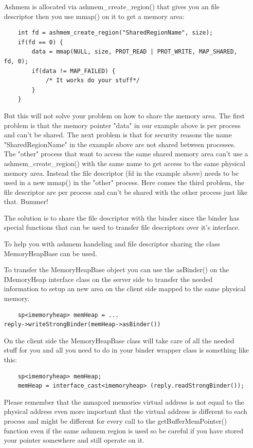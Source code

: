 \documentclass[a4paper,11pt]{article}
\begin{document}
Ashmem is allocated via ashmem_create_region() that gives you an file
descriptor then you use mmap() on it to get a memory area:
\begin{lstlisting}
    int fd = ashmem_create_region("SharedRegionName", size);
    if(fd == 0) {
        data = mmap(NULL, size, PROT_READ | PROT_WRITE, MAP_SHARED, fd, 0);
        if(data != MAP_FAILED) {
            /* It works do your stuff*/
        }
    }
\end{lstlisting}

But this will not solve your problem on how to share the memory area. The
first problem is that the memory pointer "data" in our example above is per
process and can't be shared. The next problem is that for security reasons the
name "SharedRegionName" in the example above are not shared between processes.
The "other" process that want to access the same shared memory area can't use
a ashmem_create_region() with the same name to get access to the same physical
memory area. Instead the file descriptor (fd in the example above) needs to be
used in a new mmap() in the "other" process. Here comes the third problem, the
file descriptor are per process and can't be shared with the other process
just like that. Bummer!

The solution is to share the file descriptor with the binder since the binder
has special functions that can be used to transfer file descriptors over it's
interface.

To help you with ashmem handeling and file descriptor sharing the class
MemoryHeapBase can be used. 

To transfer the MemoryHeapBase object you can use the asBinder() on the
IMemoryHeap interface class on the server side to transfer the needed
information to setup an new area on the client side mapped to the same
physical memory.
\begin{lstlisting}
    sp<imemoryheap> memHeap = ...
reply->writeStrongBinder(memHeap->asBinder())
\end{lstlisting}

On the client side the MemoryHeapBase class will take care of all the needed
stuff for you and all you need to do in your binder wrapper class is something
like this:
\begin{lstlisting}
    sp<imemoryheap> memHeap;
    memHeap = interface_cast<imemoryheap> (reply.readStrongBinder());
\end{lstlisting}
Please remember that the mmap:ed memories virtual address is not equal to the
physical address even more important that the virtual address is different to
each process and might be different for every call to the
getBufferMemPointer() function even if the same ashmem region is used so be
careful if you have stored your pointer somewhere and still operate on it.
\end{document}
